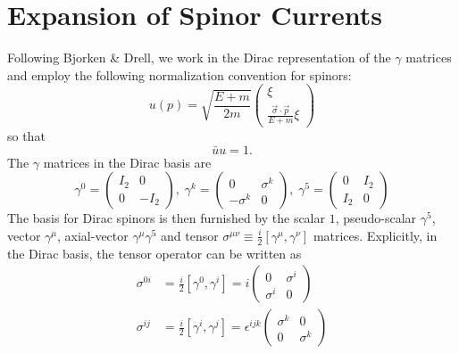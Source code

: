 \documentclass{book}[letterpaper,12pt]
\begin{document}
\chapter{Expansion of Spinor Currents}
\label{app:spinor_expansion}
\thispagestyle{headings}
Following Bjorken \& Drell, we work in the Dirac representation of the $\gamma$ matrices and employ the following normalization convention for spinors:
\begin{equation}
u(p)=\sqrt{\frac{E+m}{2m}}\left(\begin{array}{c}
\xi\\
\frac{\vec{\sigma}\cdot\vec{p}}{E+m}\xi
\end{array}\right)
\end{equation}
so that
\begin{equation}
\bar{u}u=1.
\end{equation}
The $\gamma$ matrices in the Dirac basis are
\begin{equation}
\gamma^0=\left(\begin{array}{cc}
I_2 & 0 \\
0 & -I_2
\end{array}\right),\;\gamma^k=\left(\begin{array}{cc}
0 & \sigma^k\\
-\sigma^k & 0
\end{array}\right),\;\gamma^5=\left(\begin{array}{cc}
0 & I_2\\
I_2 & 0
\end{array}\right)
\end{equation}
The basis for Dirac spinors is then furnished by the scalar $1$, pseudo-scalar $\gamma^5$, vector $\gamma^{\mu}$, axial-vector $\gamma^{\mu}\gamma^5$ and tensor $\sigma^{\mu\nu}\equiv \frac{i}{2}\left[\gamma^{\mu},\gamma^{\nu}\right]$ matrices. Explicitly, in the Dirac basis, the tensor operator can be written as
\begin{equation}
\begin{split}
\sigma^{0i}&=\frac{i}{2}\left[\gamma^0,\gamma^i\right]=i\left(\begin{array}{cc}
0 & \sigma^i\\
\sigma^i & 0
\end{array}\right)\\
\sigma^{ij}&=\frac{i}{2}\left[\gamma^i,\gamma^j\right]=\epsilon^{ijk}\left(\begin{array}{cc}
\sigma^k & 0\\
0 & \sigma^k
\end{array}\right)
\end{split}
\end{equation}
\end{document}
